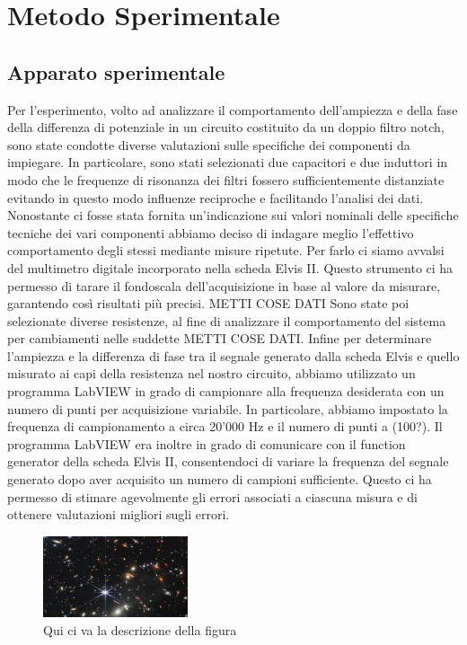 \documentclass[12pt, letterpaper]{article}
\begin{document}
\section{Metodo Sperimentale}
\subsection{Apparato sperimentale}
Per l'esperimento, volto ad analizzare il comportamento dell'ampiezza e della fase della differenza di potenziale in un circuito costituito da un doppio filtro notch,  sono state condotte diverse valutazioni sulle specifiche dei componenti da impiegare. In particolare, sono stati selezionati due capacitori e due induttori in modo che le frequenze di risonanza dei filtri fossero sufficientemente distanziate evitando in questo modo influenze reciproche e facilitando l’analisi dei dati. 
Nonostante ci fosse stata fornita un’indicazione sui valori nominali delle specifiche tecniche dei vari componenti abbiamo deciso di indagare meglio l’effettivo comportamento degli stessi mediante misure ripetute. Per farlo ci siamo avvalsi del multimetro digitale incorporato nella scheda Elvis II. Questo strumento ci ha permesso di tarare il fondoscala dell'acquisizione in base al valore da misurare, garantendo così risultati più precisi.
METTI COSE DATI
Sono state poi selezionate diverse resistenze, al fine di analizzare il comportamento del sistema per cambiamenti nelle suddette METTI COSE DATI.
Infine per determinare l'ampiezza e la differenza di fase tra il segnale generato dalla scheda Elvis e quello misurato ai capi della resistenza nel nostro circuito, abbiamo utilizzato un programma LabVIEW in grado di campionare alla frequenza desiderata con un numero di punti per acquisizione variabile. In particolare, abbiamo impostato la frequenza di campionamento a circa 20'000 Hz e il numero di punti a (100?).
Il programma LabVIEW era inoltre in grado di comunicare con il function generator della scheda Elvis II, consentendoci di variare la frequenza del segnale generato dopo aver acquisito un numero di campioni sufficiente. Questo ci ha permesso di stimare agevolmente gli errori associati a ciascuna misura e di ottenere valutazioni migliori sugli errori.

\begin{figure}
    \centering
    \includegraphics[width=0.38\textwidth]{apparato_sperimentale.jpeg}
    \caption{Qui ci va la descrizione della figura}
    \label{fig:figura}
\end{figure}
\end{document}
